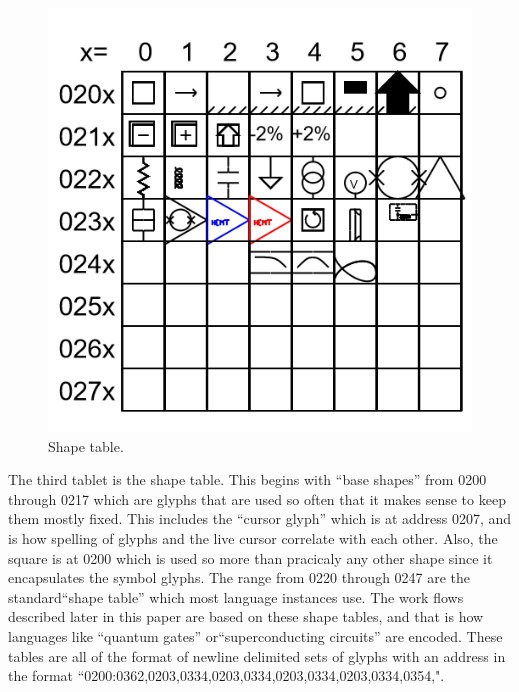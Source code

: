 \documentclass[11pt]{article}
\begin{document}
\begin{figure}

\includegraphics{figures/figure5_shapetable.png}

\caption{Shape table.}
\end{figure}

    The third tablet is the shape table.   This begins with ``base shapes'' from 0200 through 0217 which are glyphs that are used so often that it makes sense to keep them mostly fixed.  This includes the ``cursor glyph'' which is at address 0207, and is how spelling of glyphs and the live cursor correlate with each other.  Also, the square is at 0200 which is used so more than pracicaly any other shape since it encapsulates the symbol glyphs.  The range from 0220 through 0247 are the standard``shape table'' which most language instances use.  The work flows described later in this paper are based on these shape tables, and that is how languages like ``quantum gates'' or``superconducting circuits'' are encoded.  These tables are all of the format of newline delimited sets of glyphs with an address in the format ``0200:0362,0203,0334,0203,0334,0203,0334,0203,0334,0354,".  
\end{document}
